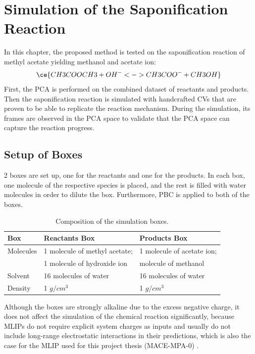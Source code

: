 \chapter{Simulation of the Saponification Reaction}\label{ch: ch4}
In this chapter, the proposed method is tested on the saponification reaction of methyl acetate yielding methanol and acetate ion:
\[
    \ce{CH3COOCH3 + OH^- <-> CH3COO^- + CH3OH}
\]
First, the PCA is performed on the combined dataset of reactants and products.
Then the saponification reaction is simulated with handcrafted CVs that are proven to be able to replicate the reaction mechanism.
During the simulation, its frames are observed in the PCA space to validate that the PCA space can capture the reaction progress.


\section{Setup of Boxes}\label{ch: ch4.1}
2 boxes are set up, one for the reactants and one for the products.
In each box, one molecule of the respective species is placed, and the rest is filled with water molecules in order to dilute the box.
Furthermore, PBC is applied to both of the boxes.

\begin{table}[h]
    \centering
    \caption{Composition of the simulation boxes.}
    \label{tab:boxes_overview}
    \begin{tabularx}{0.9\textwidth}{lXX}
        \hline
        \textbf{Box} & \textbf{Reactants Box} & \textbf{Products Box} \\
        \hline
        Molecules & 1 molecule of methyl acetate; & 1 molecule of acetate ion; \\
        & 1 molecule of hydroxide ion & \raggedright\arraybackslash 1 molecule of methanol \\
        Solvent & 16 molecules of water & 16 molecules of water \\
        Density & 1 $g/cm^3$ & 1 $g/cm^3$ \\
        \hline
    \end{tabularx}
\end{table}

Although the boxes are strongly alkaline due to the excess negative charge, it does not affect the simulation of the chemical reaction significantly, 
because MLIPs do not require explicit system charges as inputs and usually do not include long-range electrostatic interactions in their predictions, which is also the case for the MLIP used for this project thesis (MACE-MPA-0) \cite{Jacobs2025}\cite{Anstine2023}\cite{batatia2024foundation}.

